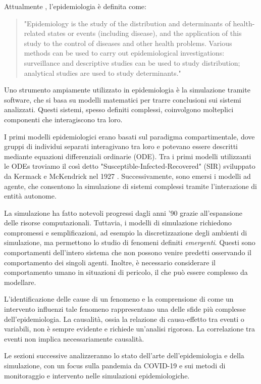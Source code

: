 Attualmente \cite{ward2012oxford}, l'epidemiologia è definita come:
\begin{quote}
    "Epidemiology is the study of the distribution and determinants of health-related states or events (including disease), and the application of this study to the control of diseases and other health problems. Various methods can be used to carry out epidemiological investigations: surveillance and descriptive studies can be used to study distribution; analytical studies are used to study determinants."
\end{quote}

Uno strumento ampiamente utilizzato in epidemiologia è la simulazione 
tramite software, che si basa su modelli matematici per trarre conclusioni 
sui sistemi analizzati. Questi sistemi, spesso definiti complessi, 
coinvolgono molteplici componenti che interagiscono tra loro.

I primi modelli epidemiologici erano basati sul paradigma compartimentale, dove gruppi di individui separati interagivano tra loro e potevano essere descritti 
mediante equazioni differenziali ordinarie (ODE). Tra i primi modelli utilizzanti le ODEs troviamo il così detto "Susceptible-Infected-Recovered" (SIR) sviluppato da 
Kermack e McKendrick nel 1927 \cite{kermack1927contribution}. Successivamente, sono emersi i modelli ad 
agente, che consentono la simulazione di sistemi complessi 
tramite l'interazione di entità autonome.

La simulazione ha fatto notevoli progressi dagli anni '90 grazie 
all'espansione delle risorse computazionali. Tuttavia, i modelli di 
simulazione richiedono compromessi e semplificazioni, ad esempio la 
discretizzazione degli ambienti di simulazione, ma permettono lo 
studio di fenomeni definiti \emph{emergenti}. Questi sono comportamenti 
dell'intero sistema che non possono venire predetti osservando 
il comportamento dei singoli agenti. Inoltre, è necessario considerare 
il comportamento umano in situazioni di pericolo, il che può 
essere complesso da modellare.

L'identificazione delle cause di un fenomeno e la comprensione di come un 
intervento influenzi tale fenomeno rappresentano una delle sfide più 
complesse dell'epidemiologia. La causalità, ossia la relazione di 
causa-effetto tra eventi o variabili, non è sempre evidente e richiede 
un'analisi rigorosa. La correlazione tra eventi non implica 
necessariamente causalità.

Le sezioni successive analizzeranno lo stato dell'arte dell'epidemiologia 
e della simulazione, con un focus sulla pandemia da COVID-19 e sui metodi 
di monitoraggio e intervento nelle simulazioni epidemiologiche.